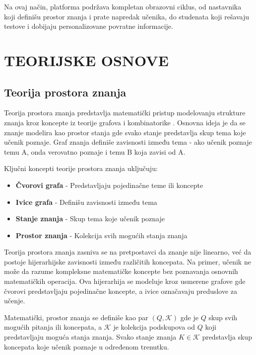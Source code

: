 \documentclass[conference]{IEEEtran}
\begin{document}
Na ovaj način, platforma podržava kompletan obrazovni ciklus, od nastavnika koji definišu prostor znanja i prate napredak učenika, do studenata koji rešavaju testove i dobijaju personalizovane povratne informacije.



\section{TEORIJSKE OSNOVE}

\subsection{Teorija prostora znanja}

Teorija prostora znanja predstavlja matematički pristup modelovanju strukture znanja kroz koncepte iz teorije grafova i kombinatorike \cite{doignon1999}. Osnovna ideja je da se znanje modelira kao prostor stanja gde svako stanje predstavlja skup tema koje učenik poznaje. Graf znanja definiše zavisnosti između tema - ako učenik poznaje temu A, onda verovatno poznaje i temu B koja zavisi od A.

Ključni koncepti teorije prostora znanja uključuju:
\begin{itemize}
\item \textbf{Čvorovi grafa} - Predstavljaju pojedinačne teme ili koncepte
\item \textbf{Ivice grafa} - Definišu zavisnosti između tema
\item \textbf{Stanje znanja} - Skup tema koje učenik poznaje
\item \textbf{Prostor znanja} - Kolekcija svih mogućih stanja znanja
\end{itemize}

Teorija prostora znanja zasniva se na pretpostavci da znanje nije linearno, već da postoje hijerarhijske zavisnosti između različitih koncepata. Na primer, učenik ne može da razume kompleksne matematičke koncepte bez poznavanja osnovnih matematičkih operacija. Ova hijerarhija se modeluje kroz usmerene grafove gde čvorovi predstavljaju pojedinačne koncepte, a ivice označavaju preduslove za učenje.

Matematički, prostor znanja se definiše kao par $(Q, \mathcal{K})$ gde je $Q$ skup svih mogućih pitanja ili koncepata, a $\mathcal{K}$ je kolekcija podskupova od $Q$ koji predstavljaju moguća stanja znanja. Svako stanje znanja $K \in \mathcal{K}$ predstavlja skup koncepata koje učenik poznaje u određenom trenutku.
\end{document}
